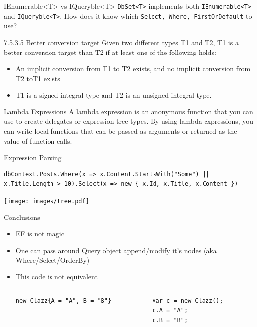 \documentclass{bredelebeamer}
\begin{document}
\begin{frame}{IEnumerable<T> vs IQueryble<T>}
    \lstinline{DbSet<T>} implements both \lstinline{IEnumerable<T>} and \lstinline{IQueryble<T>}.
    How does it know which \lstinline{Select, Where, FirstOrDefault} to use?
    \pause
    \begin{exampleblock}{7.5.3.5 Better conversion target}
        Given two different types T1 and T2, T1 is a better conversion target than T2 if at least one of the following holds:
        \begin{itemize}
            \item An implicit conversion from T1 to T2 exists, and no implicit conversion from T2 toT1 exists
            \item T1 is a signed integral type and T2 is an unsigned integral type.
        \end{itemize}
    \end{exampleblock}
    \begin{exampleblock}{Lambda Expressions}
        A lambda expression is an anonymous function that you can use to create delegates or expression tree types. By using lambda expressions, you can write local functions that can be passed as arguments or returned as the value of function calls.
    \end{exampleblock}
\end{frame}

\begin{frame}[fragile]{Expression Parsing}
    \begin{lstlisting}
dbContext.Posts.Where(x => x.Content.StartsWith("Some") || x.Title.Length > 10).Select(x => new { x.Id, x.Title, x.Content })
    \end{lstlisting}
    \texttt{[image: images/tree.pdf]}
\end{frame}

\begin{frame}[fragile]{Conclusions}
    \begin{itemize}
        \item<1-> EF is not magic
        \item<2-> One can pass around Query object append/modify it's nodes (aka Where/Select/OrderBy)
        \item<3-> { This code is not equivalent
        \begin{columns}
            \begin{column}{0.5\textwidth}
                \begin{lstlisting}
new Clazz{A = "A", B = "B"}
                \end{lstlisting}
            \end{column}
            \begin{column}{0.5\textwidth}
                \begin{lstlisting}
var c = new Clazz();
c.A = "A";
c.B = "B";
                \end{lstlisting}
            \end{column}
        \end{columns}
        }
    \end{itemize}
\end{frame}
\end{document}
